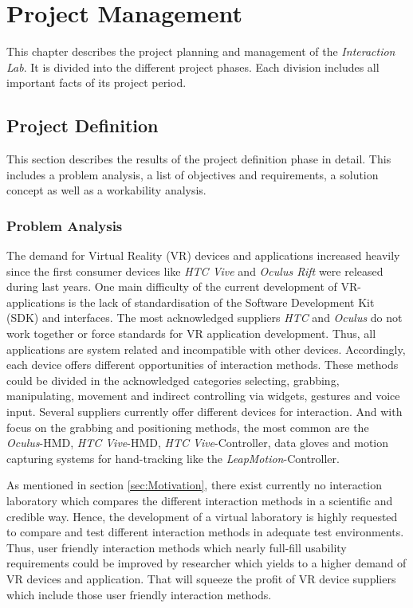 \section{Project Management} \label{sec:pm}

This chapter describes the project planning and management of the \textit{Interaction Lab}. It is divided into the different project phases. Each division includes all important facts of its project period.

\subsection{Project Definition} \label{sec:PMProjectdefinition}
This section describes the results of the project definition phase in detail. This includes a problem analysis, a list of objectives and requirements, a solution concept as well as a workability analysis.

\subsubsection{Problem Analysis}\label{sec:PMProblemAnalysis}
The demand for Virtual Reality (VR) devices and applications increased heavily since the first consumer devices like \textit{HTC Vive} and \textit{Oculus Rift} were released during last years. One main difficulty of the current development of VR-applications is the lack of standardisation of the Software Development Kit (SDK) and interfaces. The most acknowledged suppliers \textit{HTC} and \textit{Oculus} do not work together or force standards for VR application development. Thus, all applications are system related and incompatible with other devices. Accordingly, each device offers different opportunities of interaction methods. These methods could be divided in the acknowledged categories selecting, grabbing, manipulating, movement and indirect controlling via widgets, gestures and voice input. Several suppliers currently offer different devices for interaction. And with focus on the grabbing and positioning methods, the most common are the \textit{Oculus}-HMD, \textit{HTC Vive}-HMD, \textit{HTC Vive}-Controller, data gloves and motion capturing systems for hand-tracking like the \textit{LeapMotion}-Controller.

As mentioned in section \ref{sec:Motivation}, there exist currently no interaction laboratory which compares the different interaction methods in a scientific and credible way. Hence, the development of a virtual laboratory is highly requested to compare and test different interaction methods in adequate test environments. Thus, user friendly interaction methods which nearly full-fill usability requirements could be improved by researcher which yields to a higher demand of VR devices and application. That will squeeze the profit of VR device suppliers which include those user friendly interaction methods. 

